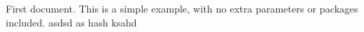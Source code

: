 \documentclass[12pt, letterpaper]{article}
\begin{document}
First document. This is a simple example, with no 
extra parameters or packages included. asdsd as hash ksahd
\end{document}
